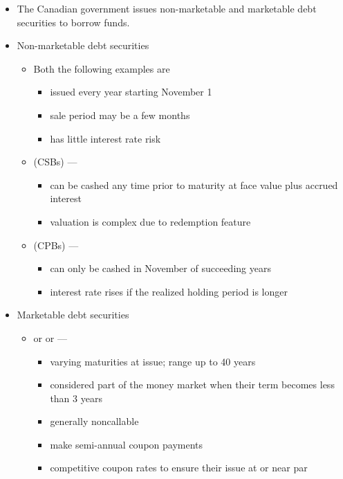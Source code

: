 \documentclass[notoc,notitlepage]{tufte-book}
\begin{document}
\begin{itemize}
  \item The Canadian government issues non-marketable and marketable
    debt securities to borrow funds.
  \item Non-marketable debt securities
    \begin{itemize}
      \item Both the following examples are
        \begin{itemize}
          \item issued every year starting November 1
          \item sale period may be a few months
          \item has little interest rate risk
        \end{itemize}
      \item {} (CSBs) ---
        \begin{itemize}
          \item can be cashed any time prior to maturity at
            face value plus accrued interest
          \item valuation is complex due to redemption feature
        \end{itemize}
      \item {} (CPBs) ---
        \begin{itemize}
          \item can only be cashed in November of succeeding years
          \item interest rate rises if the realized holding period is longer
        \end{itemize}
    \end{itemize}
  \item Marketable debt securities
    \begin{itemize}
      \item {} or 
        or  ---
        \begin{itemize}
          \item varying maturities at issue; range up to 40 years
          \item considered part of the money market when their
            term becomes less than 3 years
          \item generally noncallable
          \item make semi-annual coupon payments
          \item competitive coupon rates to ensure their issue at or near par

\end{itemize}
\end{itemize}
\end{itemize}
\end{document}

